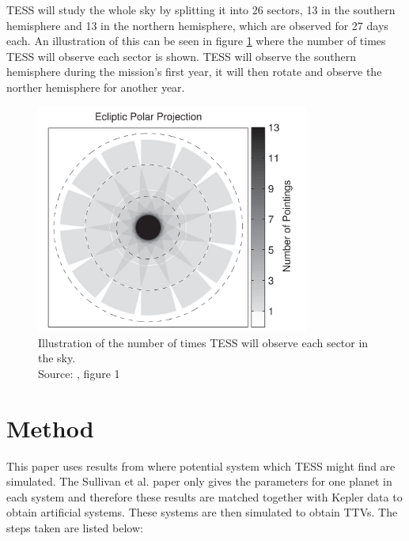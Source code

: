 \documentclass[12pt]{report}
\begin{document}
	TESS will study the whole sky by splitting it into 26 sectors, 13 in the southern hemisphere and 13 in the northern hemisphere, which are observed for 27 days each. An illustration of this can be seen in figure \ref{fig:tess_time} where the number of times TESS will observe each sector is shown. TESS will observe the southern hemisphere during the mission's first year, it will then rotate and observe the norther hemisphere for another year.
	\begin{figure}[h!]
	\centering
		\includegraphics[width=0.8\textwidth]{img/tess_observe_time.png}
		\caption{Illustration of the number of times TESS will observe each sector in the sky.\\ \small{Source: \cite{2015ApJ...809...77S}, figure 1}}
		\label{fig:tess_time}
	\end{figure}	
	
\chapter{Method}
	This paper uses results from \cite{2015ApJ...809...77S} where potential system which TESS might find are simulated. The Sullivan et al. paper only gives the parameters for one planet in each system and therefore these results are matched together with Kepler data to obtain artificial systems. These systems are then simulated to obtain TTVs. The steps taken are listed below:
	
\end{document}
